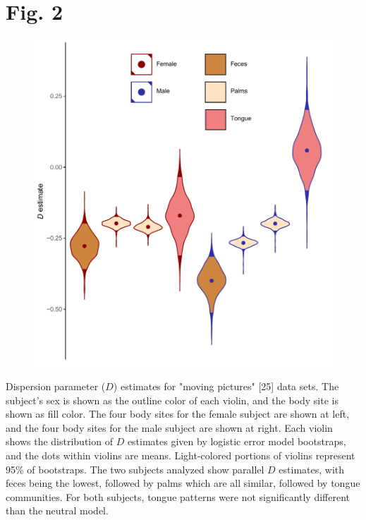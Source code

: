 \documentclass{article}
\begin{document}
\section*{Fig. 2}
\begin{figure}[ht]
	\centering
	\includegraphics[scale=0.80]{../Fig_2.pdf}
\end{figure}
Dispersion parameter (\(D\)) estimates for "moving pictures" [25] data sets. The subject’s sex is shown as the outline color of each violin, and the body site is shown as fill color. The four body sites for the female subject are shown at left, and the four body sites for the male subject are shown at right. Each violin shows the distribution of \(D\) estimates given by logistic error model bootstraps, and the dots within violins are means. Light-colored portions of violins represent 95\% of bootstraps. The two subjects analyzed show parallel \(D\) estimates, with feces being the lowest, followed by palms which are all similar, followed by tongue communities. For both subjects, tongue patterns were not significantly different than the neutral model.
%
\newpage
%
%
\end{document}

